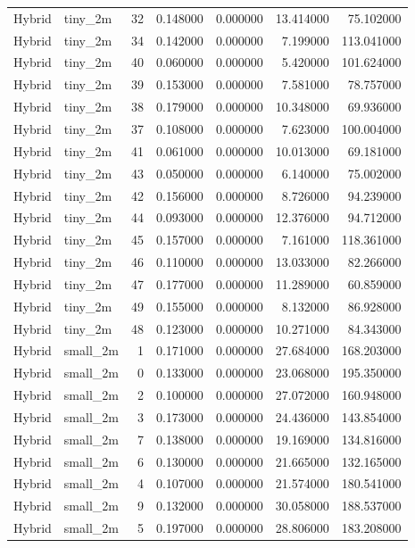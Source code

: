 \begin{tabular}{llrrrrr}
Hybrid & tiny_2m & 32 & 0.148000 & 0.000000 & 13.414000 & 75.102000 \\
Hybrid & tiny_2m & 34 & 0.142000 & 0.000000 & 7.199000 & 113.041000 \\
Hybrid & tiny_2m & 40 & 0.060000 & 0.000000 & 5.420000 & 101.624000 \\
Hybrid & tiny_2m & 39 & 0.153000 & 0.000000 & 7.581000 & 78.757000 \\
Hybrid & tiny_2m & 38 & 0.179000 & 0.000000 & 10.348000 & 69.936000 \\
Hybrid & tiny_2m & 37 & 0.108000 & 0.000000 & 7.623000 & 100.004000 \\
Hybrid & tiny_2m & 41 & 0.061000 & 0.000000 & 10.013000 & 69.181000 \\
Hybrid & tiny_2m & 43 & 0.050000 & 0.000000 & 6.140000 & 75.002000 \\
Hybrid & tiny_2m & 42 & 0.156000 & 0.000000 & 8.726000 & 94.239000 \\
Hybrid & tiny_2m & 44 & 0.093000 & 0.000000 & 12.376000 & 94.712000 \\
Hybrid & tiny_2m & 45 & 0.157000 & 0.000000 & 7.161000 & 118.361000 \\
Hybrid & tiny_2m & 46 & 0.110000 & 0.000000 & 13.033000 & 82.266000 \\
Hybrid & tiny_2m & 47 & 0.177000 & 0.000000 & 11.289000 & 60.859000 \\
Hybrid & tiny_2m & 49 & 0.155000 & 0.000000 & 8.132000 & 86.928000 \\
Hybrid & tiny_2m & 48 & 0.123000 & 0.000000 & 10.271000 & 84.343000 \\
Hybrid & small_2m & 1 & 0.171000 & 0.000000 & 27.684000 & 168.203000 \\
Hybrid & small_2m & 0 & 0.133000 & 0.000000 & 23.068000 & 195.350000 \\
Hybrid & small_2m & 2 & 0.100000 & 0.000000 & 27.072000 & 160.948000 \\
Hybrid & small_2m & 3 & 0.173000 & 0.000000 & 24.436000 & 143.854000 \\
Hybrid & small_2m & 7 & 0.138000 & 0.000000 & 19.169000 & 134.816000 \\
Hybrid & small_2m & 6 & 0.130000 & 0.000000 & 21.665000 & 132.165000 \\
Hybrid & small_2m & 4 & 0.107000 & 0.000000 & 21.574000 & 180.541000 \\
Hybrid & small_2m & 9 & 0.132000 & 0.000000 & 30.058000 & 188.537000 \\
Hybrid & small_2m & 5 & 0.197000 & 0.000000 & 28.806000 & 183.208000 \\

\end{tabular}
